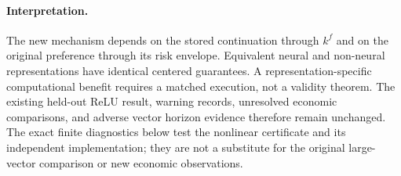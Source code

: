 \paragraph{Interpretation.}
The new mechanism depends on the stored continuation through $k^f$ and on the original preference through its risk envelope. Equivalent neural and non-neural representations have identical centered guarantees. A representation-specific computational benefit requires a matched execution, not a validity theorem. The existing held-out ReLU result, warning records, unresolved economic comparisons, and adverse vector horizon evidence therefore remain unchanged. The exact finite diagnostics below test the nonlinear certificate and its independent implementation; they are not a substitute for the original large-vector comparison or new economic observations.
